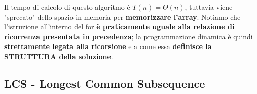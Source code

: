 \documentclass[12pt]{article}
\begin{document}
\noindent
Il tempo di calcolo di questo algoritmo è $T(n) = \Theta(n)$, tuttavia viene "sprecato" dello spazio in memoria per \textbf{memorizzare l'array}.
Notiamo che l'istruzione all'interno del for \textbf{è praticamente uguale alla relazione di ricorrenza presentata in precedenza}; la programmazione dinamica
è quindi \textbf{strettamente legata alla ricorsione} e a come essa \textbf{definisce la STRUTTURA della soluzione}.
\subsection{LCS - Longest Common Subsequence}
\end{document}
